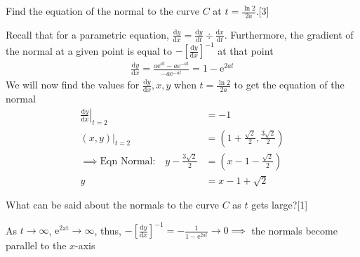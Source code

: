 \documentclass[12pt, a4 paper]{article}
\begin{document}
\begin{outline}[enumerate]
\begin{answer}

 \end{answer}

 \2 Find the equation of the normal to the curve \(C\) at \(t = \frac{\ln{2}}{{2a}}\).\hfill[3]
 \begin{answer}
  Recall that for a parametric equation, \(\frac{\mathrm{d}y}{\mathrm{d}x}=\frac{\mathrm{d}y}{\mathrm{d}t}\div\frac{\mathrm{d}x}{\mathrm{d}t}\). Furthermore, the gradient of the normal at a given point is equal to \(-[\frac{\mathrm{d}y}{\mathrm{d}x}]^{-1}\) at that point
  \begin{align*}
   \frac{\mathrm{d}y}{\mathrm{d}x}=\frac{a\mathrm{e}^{at}-a\mathrm{e}^{-at}}{-a\mathrm{e}^{-at}} = 1-\mathrm{e}^{2at}
  \end{align*}
  We will now find the values for \(\frac{\mathrm{d}y}{\mathrm{d}x}, x, y\) when \(t=\frac{\ln2}{2a}\) to get the equation of the normal
  \begin{align*}
   \left.\frac{\mathrm{d}y}{\mathrm{d}x}\right|_{t=2}     & = -1                                      \\
   (x,y)|_{t=2}                                           & = (1+\frac{\sqrt2}{2}, \frac{3\sqrt2}{2}) \\
   \implies \textrm{Eqn Normal:}\quad y-\frac{3\sqrt2}{2} & = (x-1-\frac{\sqrt2}{2})                  \\
   y                                                      & = x-1+\sqrt2
  \end{align*}
 \end{answer}

 \2 What can be said about the normals to the curve \(C\) as \(t\) gets large?\hfill[1]
 \begin{answer}
  As \(t\rightarrow\infty \), \(\mathrm{e^{2at}}\rightarrow\infty\), thus, \(-[\frac{\mathrm{d}y}{\mathrm{d}x}]^{-1} = -\frac{1}{1-\mathrm{e}^{2at}}\rightarrow0\implies\) the normals become parallel to the \(x\)-axis
 \end{answer}



\end{outline}
\end{document}

